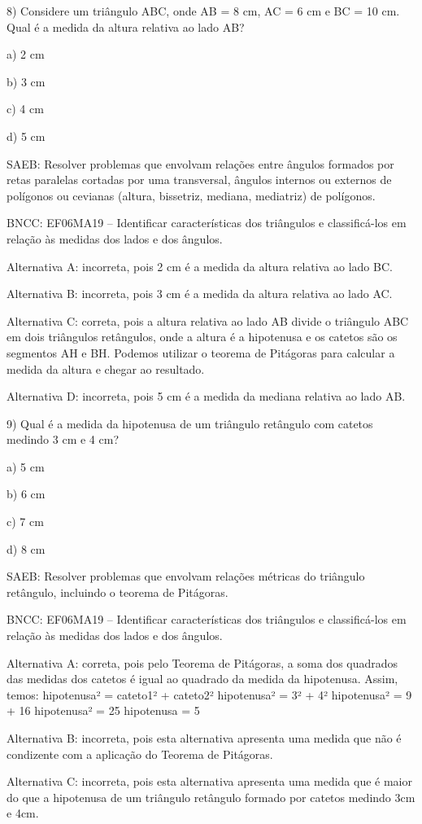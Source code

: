 8) Considere um triângulo ABC, onde AB = 8 cm, AC = 6 cm e BC = 10 cm.
Qual é a medida da altura relativa ao lado AB?

a) 2 cm

b) 3 cm

c) 4 cm

d) 5 cm

SAEB: Resolver problemas que envolvam relações entre ângulos formados
por retas paralelas cortadas por uma transversal, ângulos internos ou
externos de polígonos ou cevianas (altura, bissetriz, mediana,
mediatriz) de polígonos.

BNCC: EF06MA19 -- Identificar características dos triângulos e
classificá-los em relação às medidas dos lados e dos ângulos.

Alternativa A: incorreta, pois 2 cm é a medida da altura relativa ao
lado BC.

Alternativa B: incorreta, pois 3 cm é a medida da altura relativa ao
lado AC.

Alternativa C: correta, pois a altura relativa ao lado AB divide o
triângulo ABC em dois triângulos retângulos, onde a altura é a
hipotenusa e os catetos são os segmentos AH e BH. Podemos utilizar o
teorema de Pitágoras para calcular a medida da altura e chegar ao
resultado.

Alternativa D: incorreta, pois 5 cm é a medida da mediana relativa ao
lado AB.

9) Qual é a medida da hipotenusa de um triângulo retângulo com catetos
medindo 3 cm e 4 cm?

a) 5 cm

b) 6 cm

c) 7 cm

d) 8 cm

SAEB: Resolver problemas que envolvam relações métricas do triângulo
retângulo, incluindo o teorema de Pitágoras.

BNCC: EF06MA19 -- Identificar características dos triângulos e
classificá-los em relação às medidas dos lados e dos ângulos.

Alternativa A: correta, pois pelo Teorema de Pitágoras, a soma dos
quadrados das medidas dos catetos é igual ao quadrado da medida da
hipotenusa. Assim, temos: hipotenusa² = cateto1² + cateto2² hipotenusa²
= 3² + 4² hipotenusa² = 9 + 16 hipotenusa² = 25 hipotenusa = 5

Alternativa B: incorreta, pois esta alternativa apresenta uma medida que
não é condizente com a aplicação do Teorema de Pitágoras.

Alternativa C: incorreta, pois esta alternativa apresenta uma medida que
é maior do que a hipotenusa de um triângulo retângulo formado por
catetos medindo 3cm e 4cm.

